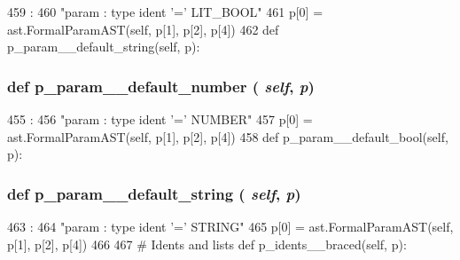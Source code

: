 \begin{DoxyVerb}
\begin{DoxyCode}
459                                       :
460         "param : type ident '=' LIT_BOOL"
461         p[0] = ast.FormalParamAST(self, p[1], p[2], p[4])
462 
    def p_param__default_string(self, p):
\end{DoxyCode}
\hypertarget{classslicc_1_1parser_1_1SLICC_ace79f284cc764b1bcd17d6b67fad8907}{
\subsubsection[{p\_\-param\_\-\_\-default\_\-number}]{\setlength{\rightskip}{0pt plus 5cm}def p\_\-param\_\-\_\-default\_\-number ( {\em self}, \/   {\em p})}}
\label{classslicc_1_1parser_1_1SLICC_ace79f284cc764b1bcd17d6b67fad8907}



\begin{DoxyCode}
455                                         :
456         "param : type ident '=' NUMBER"
457         p[0] = ast.FormalParamAST(self, p[1], p[2], p[4])
458 
    def p_param__default_bool(self, p):
\end{DoxyCode}
\hypertarget{classslicc_1_1parser_1_1SLICC_aab237e59f5c5672509e5c0bb560bbaa2}{
\subsubsection[{p\_\-param\_\-\_\-default\_\-string}]{\setlength{\rightskip}{0pt plus 5cm}def p\_\-param\_\-\_\-default\_\-string ( {\em self}, \/   {\em p})}}
\label{classslicc_1_1parser_1_1SLICC_aab237e59f5c5672509e5c0bb560bbaa2}



\begin{DoxyCode}
463                                         :
464         "param : type ident '=' STRING"
465         p[0] = ast.FormalParamAST(self, p[1], p[2], p[4])
466 
467     # Idents and lists
    def p_idents__braced(self, p):
\end{DoxyCode}
\hypertarget{classslicc_1_1parser_1_1SLICC_a2d8f55c927464513c7500638efab833c}{
}
\end{DoxyVerb}
